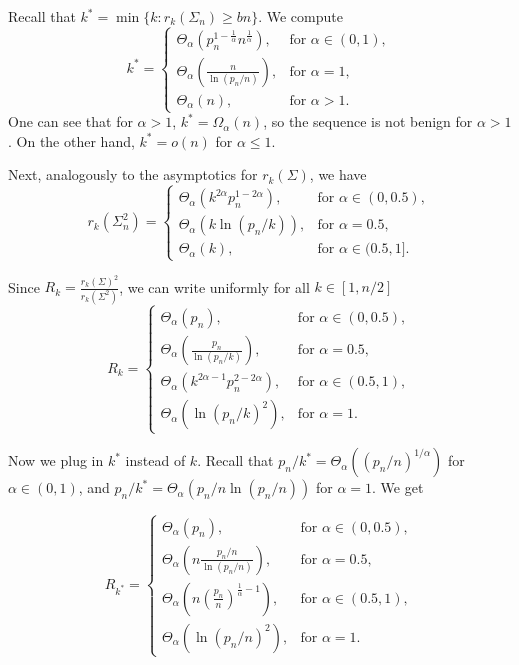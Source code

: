 \documentclass[11pt,notitlepage]{article}
\begin{document}
Recall that $k^\ast = \min\{k: r_k(\Sigma_n) \geq bn\}$.  We compute
\[
k^\ast =  \begin{cases}
\Theta_\alpha\left( p_n^{1-\frac{1}{\alpha}}  n^{\frac{1}{\alpha}}\right),& \text{for }\alpha \in (0,1),\\
\Theta_\alpha\left(\frac{n}{\ln(p_n/n)}\right), &\text{for }\alpha = 1,\\
\Theta_\alpha\left(n\right),&  \text{for }\alpha > 1.
\end{cases}
\]
One can see that for $\alpha > 1$, $k^\ast = \Omega_\alpha(n)$, so the sequence is not benign for  $\alpha > 1$. On the other hand, $k^\ast = o(n)$ for $\alpha \leq 1$.

Next, analogously to the asymptotics for $r_k(\Sigma)$, we have
\[
r_k(\Sigma_n^2) =  \begin{cases}
\Theta_\alpha\left(k^{2\alpha} p_n^{1-{2\alpha}}\right),& \text{for }\alpha \in (0,0.5),\\
\Theta_\alpha\left(k\ln(p_n/k)\right), &\text{for }\alpha = 0.5,\\
\Theta_\alpha\left(k\right),&  \text{for }\alpha \in (0.5, 1].
\end{cases}
\]

Since $R_k = \frac{r_k(\Sigma)^2}{r_k(\Sigma^2)}$, we can write uniformly for all $k \in [1, n/2]$
\[
R_k =  \begin{cases}
\Theta_\alpha\left(p_n\right),& \text{for }\alpha \in (0,0.5),\\
\Theta_\alpha\left(\frac{p_n}{\ln(p_n/k)}\right), &\text{for }\alpha = 0.5,\\
\Theta_\alpha\left(k^{2\alpha - 1}p_n^{2 - 2\alpha}\right),&  \text{for }\alpha \in  (0.5, 1),\\
\Theta_\alpha\left(\ln(p_n/k)^2\right),&  \text{for }\alpha=1.
\end{cases}
\]

Now we plug in $k^\ast$ instead of $k$. Recall that $p_n/k^\ast = \Theta_\alpha\left((p_n/n)^{1/\alpha}\right)$ for $\alpha \in (0,1)$, and $p_n/k^\ast = \Theta_\alpha\left(p_n/n \ln(p_n/n)\right)$ for $\alpha = 1$. We get

\[
R_{k^\ast} =  \begin{cases}
\Theta_\alpha\left(p_n\right),& \text{for }\alpha \in (0,0.5),\\
\Theta_\alpha\left(n\frac{p_n/n}{\ln(p_n/n)}\right) , &\text{for }\alpha = 0.5,\\
\Theta_\alpha\left(n\left(\frac{p_n}{n}\right)^{\frac{1}{\alpha} - 1}\right),&  \text{for }\alpha \in  (0.5, 1),\\
\Theta_\alpha\left(\ln(p_n/n)^2\right),&  \text{for }\alpha=1.
\end{cases}
\]
\end{document}
